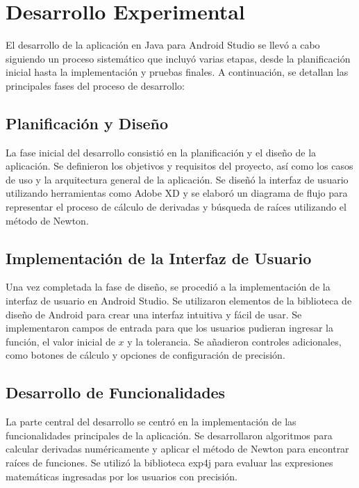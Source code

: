 \documentclass[conference]{IEEEtran}
\begin{document}
 
\section{Desarrollo Experimental}

El desarrollo de la aplicación en Java para Android Studio se llevó a cabo siguiendo un proceso sistemático que incluyó varias etapas, desde la planificación inicial hasta la implementación y pruebas finales. A continuación, se detallan las principales fases del proceso de desarrollo:

\subsection{Planificación y Diseño}

La fase inicial del desarrollo consistió en la planificación y el diseño de la aplicación. Se definieron los objetivos y requisitos del proyecto, así como los casos de uso y la arquitectura general de la aplicación. Se diseñó la interfaz de usuario utilizando herramientas como Adobe XD y se elaboró un diagrama de flujo para representar el proceso de cálculo de derivadas y búsqueda de raíces utilizando el método de Newton.

\subsection{Implementación de la Interfaz de Usuario}

Una vez completada la fase de diseño, se procedió a la implementación de la interfaz de usuario en Android Studio. Se utilizaron elementos de la biblioteca de diseño de Android para crear una interfaz intuitiva y fácil de usar. Se implementaron campos de entrada para que los usuarios pudieran ingresar la función, el valor inicial de \( x \) y la tolerancia. Se añadieron controles adicionales, como botones de cálculo y opciones de configuración de precisión.

\subsection{Desarrollo de Funcionalidades}

La parte central del desarrollo se centró en la implementación de las funcionalidades principales de la aplicación. Se desarrollaron algoritmos para calcular derivadas numéricamente y aplicar el método de Newton para encontrar raíces de funciones. Se utilizó la biblioteca exp4j para evaluar las expresiones matemáticas ingresadas por los usuarios con precisión.
\end{document}
